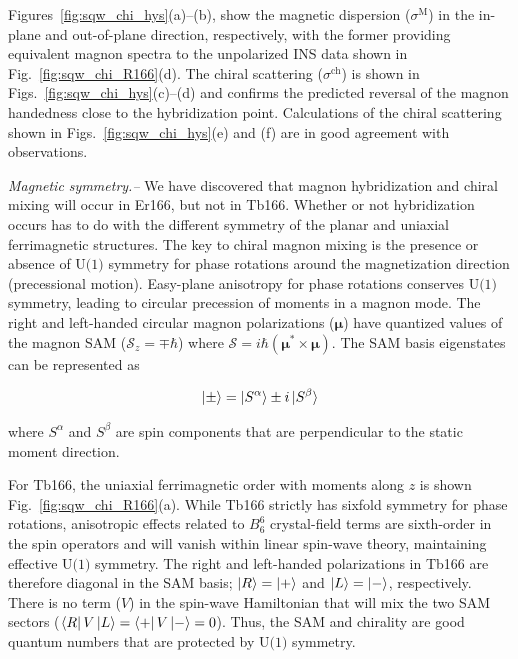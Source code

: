 \documentclass[
amsmath,amssymb,aps,showkeys, nofootinbib, twocolumn,superscriptaddress,longbibliography
]{revtex4-2}
\begin{document}
    Figures~\ref{fig:sqw_chi_hys}(a)--(b), show the magnetic dispersion ($\sigma^\text{M}$) in the in-plane and out-of-plane direction, respectively, with the former providing equivalent magnon spectra to the unpolarized INS data shown in Fig.~\ref{fig:sqw_chi_R166}(d). The chiral scattering ($\sigma^\text{ch}$) is shown in Figs.~\ref{fig:sqw_chi_hys}(c)--(d) and confirms the predicted reversal of the magnon handedness close to the hybridization point. Calculations of the chiral scattering shown in Figs.~\ref{fig:sqw_chi_hys}(e) and (f) are in good agreement with observations.


{\it Magnetic symmetry.--}
    We have discovered that magnon hybridization and chiral mixing will occur in Er166, but not in Tb166. Whether or not hybridization occurs has to do with the different symmetry of the planar and uniaxial ferrimagnetic structures. The key to chiral magnon mixing is the presence or absence of $\text{U(1)}$ symmetry for phase rotations around the magnetization direction (precessional motion). Easy-plane anisotropy for phase rotations conserves $\text{U(1)}$ symmetry, leading to circular precession of moments in a magnon mode. The right and left-handed circular magnon polarizations ($\boldsymbol{\mu}$) have quantized values of the magnon SAM ($\mathcal{S}_z = \mp \hbar$) where $\boldsymbol{\mathcal{S}}=i\hbar(\boldsymbol{\mu}^*\times\boldsymbol{\mu})$. The SAM basis eigenstates can be represented as

    \begin{equation}
        \ket{\pm} = \ket{S^{\alpha}} \pm i\ket{S^{\beta}}
    \end{equation}

    where $S^{\alpha}$ and $S^{\beta}$ are spin components that are perpendicular to the static moment direction.

    For Tb166, the uniaxial ferrimagnetic order with moments along $z$ is shown Fig.~\ref{fig:sqw_chi_R166}(a). While Tb166 strictly has sixfold symmetry for phase rotations, anisotropic effects related to $B^6_6$ crystal-field terms are sixth-order in the spin operators and will vanish within linear spin-wave theory, maintaining effective $\text{U(1)}$ symmetry. The right and left-handed polarizations in Tb166 are therefore diagonal in the SAM basis; $\ket{R} = \ket{+}$ and $\ket{L} = \ket{-}$, respectively.  There is no term ($V$) in the spin-wave Hamiltonian that will mix the two SAM sectors ($\bra{R}V\ket{L}=\bra{+}V\ket{-}=0$).  Thus, the SAM and chirality are good quantum numbers that are protected by $\text{U(1)}$ symmetry.
\end{document}
